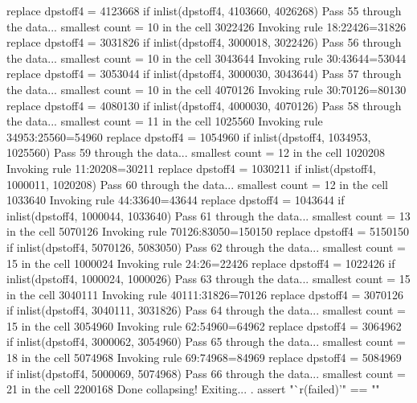   replace dpstoff4 = 4123668 if inlist(dpstoff4, 4103660, 4026268)
Pass 55 through the data...
  smallest count = 10 in the cell      3022426
  Invoking rule 18:22426=31826
  replace dpstoff4 = 3031826 if inlist(dpstoff4, 3000018, 3022426)
Pass 56 through the data...
  smallest count = 10 in the cell      3043644
  Invoking rule 30:43644=53044
  replace dpstoff4 = 3053044 if inlist(dpstoff4, 3000030, 3043644)
Pass 57 through the data...
  smallest count = 10 in the cell      4070126
  Invoking rule 30:70126=80130
  replace dpstoff4 = 4080130 if inlist(dpstoff4, 4000030, 4070126)
Pass 58 through the data...
  smallest count = 11 in the cell      1025560
  Invoking rule 34953:25560=54960
  replace dpstoff4 = 1054960 if inlist(dpstoff4, 1034953, 1025560)
Pass 59 through the data...
  smallest count = 12 in the cell      1020208
  Invoking rule 11:20208=30211
  replace dpstoff4 = 1030211 if inlist(dpstoff4, 1000011, 1020208)
Pass 60 through the data...
  smallest count = 12 in the cell      1033640
  Invoking rule 44:33640=43644
  replace dpstoff4 = 1043644 if inlist(dpstoff4, 1000044, 1033640)
Pass 61 through the data...
  smallest count = 13 in the cell      5070126
  Invoking rule 70126:83050=150150
  replace dpstoff4 = 5150150 if inlist(dpstoff4, 5070126, 5083050)
Pass 62 through the data...
  smallest count = 15 in the cell      1000024
  Invoking rule 24:26=22426
  replace dpstoff4 = 1022426 if inlist(dpstoff4, 1000024, 1000026)
Pass 63 through the data...
  smallest count = 15 in the cell      3040111
  Invoking rule 40111:31826=70126
  replace dpstoff4 = 3070126 if inlist(dpstoff4, 3040111, 3031826)
Pass 64 through the data...
  smallest count = 15 in the cell      3054960
  Invoking rule 62:54960=64962
  replace dpstoff4 = 3064962 if inlist(dpstoff4, 3000062, 3054960)
Pass 65 through the data...
  smallest count = 18 in the cell      5074968
  Invoking rule 69:74968=84969
  replace dpstoff4 = 5084969 if inlist(dpstoff4, 5000069, 5074968)
Pass 66 through the data...
  smallest count = 21 in the cell      2200168
  Done collapsing! Exiting...
{\smallskip}
. assert "`r(failed)'" == ""      
{\smallskip}
